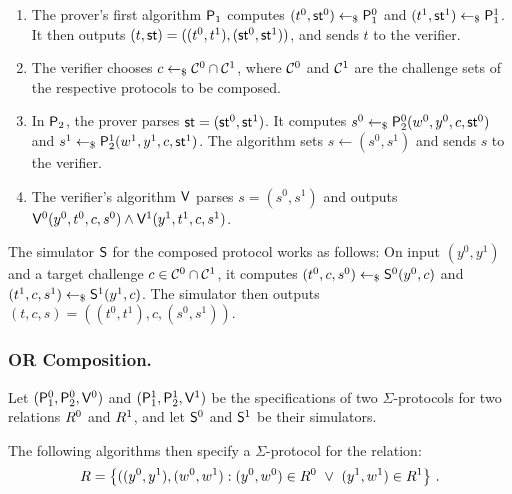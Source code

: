 \documentclass[runningheads]{llncs}
\begin{document}
  \begin{enumerate}
    \item
      The prover's first algorithm $\mathsf{P}_1$ computes $(t^0,\mathsf{st}^0)\gets_{\$}\mathsf{P}_1^0$ and $(t^1,\mathsf{st}^1)\gets_{\$}\mathsf{P}_1^1$.
      It then outputs $(t,\mathsf{st}) = ((t^0,t^1),(\mathsf{st}^0,\mathsf{st}^1))$, and sends $t$ to the verifier.
    \item
      The verifier chooses $c\gets_{\$}\mathcal{C}^0\cap\mathcal{C}^1$, where $\mathcal{C}^0$ and $\mathcal{C}^1$ are the challenge sets of the respective protocols to be composed.
    \item
      In $\mathsf{P}_2$, the prover parses $\mathsf{st}=(\mathsf{st}^0,\mathsf{st}^1)$.
      It computes $s^0\gets_{\$}\mathsf{P}_2^0(w^0,y^0,c,\mathsf{st}^0)$ and $s^1\gets_{\$}\mathsf{P}_2^1(w^1,y^1,c,\mathsf{st}^1)$.
      The algorithm sets $s\gets(s^0,s^1)$ and sends $s$ to the verifier.
    \item
      The verifier's algorithm $\mathsf{V}$ parses $s=(s^0,s^1)$ and outputs $\mathsf{V}^0(y^0,t^0,c,s^0)\land\mathsf{V}^1(y^1,t^1,c,s^1)$. 
  \end{enumerate}

  The simulator $\mathsf{S}$ for the composed protocol works as follows:
  On input $(y^0,y^1)$ and a target challenge $c\in\mathcal{C}^0\cap\mathcal{C}^1$, it computes $(t^0,c,s^0)\gets_{\$}\mathsf{S}^0(y^0,c)$ and $(t^1,c,s^1)\gets_{\$}\mathsf{S}^1(y^1,c)$.
  The simulator then outputs $(t,c,s)=((t^0,t^1),c,(s^0,s^1))$.

\subsubsection{OR Composition.}
  Let $(\mathsf{P}_1^0,\mathsf{P}_2^0,\mathsf{V}^0)$ and $(\mathsf{P}_1^1,\mathsf{P}_2^1,\mathsf{V}^1)$ be the specifications of two $\Sigma$-protocols for two relations $R^0$ and $R^1$, and let $\mathsf{S}^0$ and $\mathsf{S}^1$ be their simulators.

  The following algorithms then specify a $\Sigma$-protocol for the relation:
$$
  R = \left\{ ((y^0,y^1),(w^0,w^1) : (y^0,w^0)\in R^0 ~\lor~ (y^1,w^1)\in R^1\right\}\,.
$$
\end{document}
